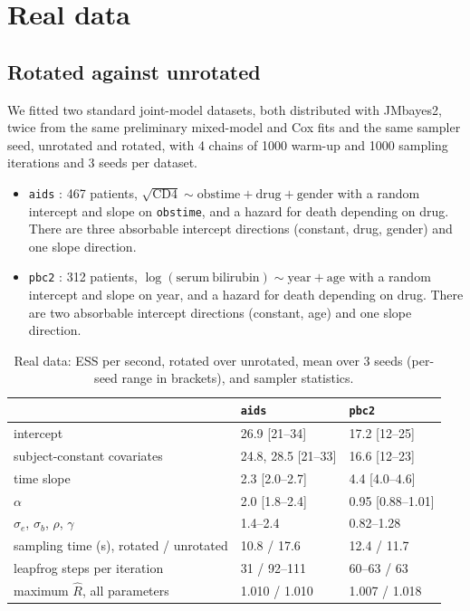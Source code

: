 \section{Real data}\label{sec:realdata}

\subsection{Rotated against unrotated}

We fitted two standard joint-model datasets, both distributed with
JMbayes2, twice from the same preliminary mixed-model and Cox fits and the
same sampler seed, unrotated
and rotated, with 4 chains of 1000 warm-up and 1000 sampling iterations
and 3 seeds per dataset.
\begin{itemize}
\item \texttt{aids} \citep{abrams1994,guo2004}: 467 patients,
$\sqrt{\mathrm{CD4}} \sim \mathrm{obstime} + \mathrm{drug} +
\mathrm{gender}$ with a random intercept and slope on \texttt{obstime}, and
a hazard for death depending on drug. There are three absorbable intercept
directions (constant, drug, gender) and one slope direction.
\item \texttt{pbc2} \citep{murtaugh1994}: 312 patients, $\log(\mathrm{serum\
bilirubin}) \sim \mathrm{year} + \mathrm{age}$ with a random intercept and
slope on year, and a hazard for death depending on drug. There are two
absorbable intercept directions (constant, age) and one slope direction.
\end{itemize}

\begin{table}[t]
\centering
\caption{Real data: ESS per second, rotated over unrotated, mean over 3
seeds (per-seed range in brackets), and sampler statistics.}
\label{tab:real}
\small
\begin{tabular}{lll}
\toprule
& \texttt{aids} & \texttt{pbc2} \\
\midrule
intercept & 26.9 [21--34] & 17.2 [12--25] \\
subject-constant covariates & 24.8, 28.5 [21--33] & 16.6 [12--23] \\
time slope & 2.3 [2.0--2.7] & 4.4 [4.0--4.6] \\
$\alpha$ & 2.0 [1.8--2.4] & 0.95 [0.88--1.01] \\
$\sigma_e$, $\sigma_b$, $\rho$, $\gamma$ & 1.4--2.4 & 0.82--1.28 \\
sampling time (s), rotated / unrotated & 10.8 / 17.6 & 12.4 / 11.7 \\
leapfrog steps per iteration & 31 / 92--111 & 60--63 / 63 \\
maximum $\hat R$, all parameters & 1.010 / 1.010 & 1.007 / 1.018 \\
\bottomrule
\end{tabular}
\end{table}

